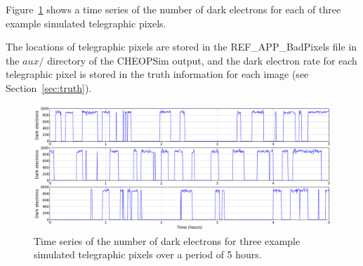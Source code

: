 \documentclass[11pt]{article}      %
\begin{document}
Figure~\ref{fig:telegraphic} shows a time series of the number of dark electrons for each of three example simulated telegraphic pixels.

The locations of telegraphic pixels are stored in the REF\_APP\_BadPixels file in the $aux/$ directory of the CHEOPSim output, and the dark electron rate for each telegraphic pixel is stored in the truth information for each image (see Section~\ref{sec:truth}).

\begin{figure}[hbtp]
  \begin{center}
    \includegraphics[width=\textwidth]{telegraphic.png}
    \caption{Time series of the number of dark electrons for three example simulated telegraphic pixels over a period of 5 hours.}
    \label{fig:telegraphic}
  \end{center}
\end{figure}
\end{document}
